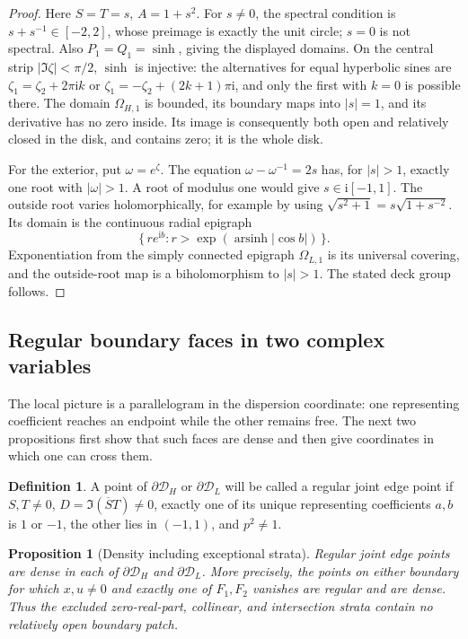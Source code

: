 \documentclass[11pt]{article}
\numberwithin{equation}{section}
\newtheorem{proposition}[theorem]{Proposition}
\theoremstyle{definition}
\newtheorem{definition}[theorem]{Definition}
\newcommand{\ii}{\mathrm i}
\renewcommand{\DH}{\mathcal D_H}
\newcommand{\DL}{\mathcal D_L}
\begin{document}
\begin{proof}
Here \(S=T=s\), \(A=1+s^2\).  For \(s\ne0\), the spectral
condition is \(s+s^{-1}\in[-2,2]\), whose preimage is
exactly the unit circle; \(s=0\) is not spectral.
Also \(P_1=Q_1=\sinh\), giving the displayed domains.
On the central strip \(|\Im\zeta|<\pi/2\), \(\sinh\)
is injective: the alternatives for equal hyperbolic sines
are \(\zeta_1=\zeta_2+2\pi\ii k\) or
\(\zeta_1=-\zeta_2+(2k+1)\pi\ii\), and only the first
with \(k=0\) is possible there.  The domain
\(\Omega_{H,1}\) is bounded, its boundary maps into
\(|s|=1\), and its derivative has no zero inside.
Its image is consequently both open and relatively closed
in the disk, and contains zero; it is the whole disk.

For the exterior, put \(\omega=e^\zeta\).
The equation \(\omega-\omega^{-1}=2s\) has, for \(|s|>1\),
exactly one root with \(|\omega|>1\).
A root of modulus one would give \(s\in\ii[-1,1]\).
The outside root varies holomorphically, for example by
using \(\sqrt{s^2+1}=s\sqrt{1+s^{-2}}\).
Its domain is the continuous radial epigraph
\[
 \{\,r e^{\ii b}:r>\exp(\operatorname{arsinh}|\cos b|)\,\}.
 \]
Exponentiation from the simply connected epigraph
\(\Omega_{L,1}\) is its universal covering, and the
outside-root map is a biholomorphism to \(|s|>1\).
The stated deck group follows.
\end{proof}

\subsection{Regular boundary faces in two complex variables}
\label{geo:regular-section}

The local picture is a parallelogram in the dispersion coordinate:
one representing coefficient reaches an endpoint while the other
remains free. The next two propositions first show that such faces
are dense and then give coordinates in which one can cross them.

\begin{definition}\label{geo:regular-definition}
A point of \(\partial\DH\) or \(\partial\DL\) will be called
a regular joint edge point if \(S,T\ne0\),
\(D=\Im(\overline S T)\ne0\), exactly one of its unique
representing coefficients \(a,b\) is \(1\) or \(-1\),
the other lies in \((-1,1)\), and \(p^2\ne1\).
\end{definition}

\begin{proposition}[Density including exceptional strata]
\label{geo:joint-density}
Regular joint edge points are dense in each of
\(\partial\DH\) and \(\partial\DL\).
More precisely, the points on either boundary for which
\(x,u\ne0\) and exactly one of \(F_1,F_2\) vanishes
are regular and are dense.  Thus the excluded zero-real-part,
collinear, and intersection strata contain no relatively
open boundary patch.
\end{proposition}
\end{document}
